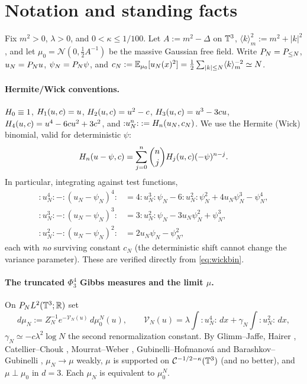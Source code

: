 \section*{Notation and standing facts}

Fix $m^2>0$, $\lambda>0$, and $0<\kappa\le 1/100$. Let $A:=m^2-\Delta$ on $\mathbb{T}^3$,
$\langle k\rangle_m^2:=m^2+|k|^2$, and let $\mu_0=\mathcal N(0,\tfrac12A^{-1})$ be the
massive Gaussian free field. Write $P_N=P_{\le N}$, $u_N=P_N u$,
$\psi_N=P_N\psi$, and
$c_N:=\mathbb{E}_{\mu_0}[u_N(x)^2]=\tfrac12\sum_{|k|\le N}\langle k\rangle_m^{-2}\simeq N$.

\paragraph{Hermite/Wick conventions.}
$H_0\equiv1$, $H_1(u,c)=u$, $H_2(u,c)=u^2-c$, $H_3(u,c)=u^3-3cu$,
$H_4(u,c)=u^4-6cu^2+3c^2$, and ${:}u_N^n{:}:=H_n(u_N,c_N)$. We use the
Hermite (Wick) binomial, valid for deterministic $\psi$:
\begin{equation}\label{eq:wickbin}
H_n(u-\psi,c)=\sum_{j=0}^n\binom njH_j(u,c)(-\psi)^{n-j}.
\end{equation}
In particular, integrating against test functions,
\begin{align}
{:}u_N^4{:}-{:}(u_N-\psi_N)^4{:}&=4{:}u_N^3{:}\psi_N-6{:}u_N^2{:}\psi_N^2+4u_N\psi_N^3-\psi_N^4,\label{eq:diff4}\\
{:}u_N^3{:}-{:}(u_N-\psi_N)^3{:}&=3{:}u_N^2{:}\psi_N-3u_N\psi_N^2+\psi_N^3,\label{eq:diff3}\\
{:}u_N^2{:}-{:}(u_N-\psi_N)^2{:}&=2u_N\psi_N-\psi_N^2,\label{eq:diff2}
\end{align}
each with \emph{no} surviving constant $c_N$ (the deterministic shift cannot change the
variance parameter). These are verified directly from \eqref{eq:wickbin}.

\paragraph{The truncated $\Phi^4_3$ Gibbs measures and the limit $\mu$.}
On $P_N L^2(\mathbb{T}^3;\mathbb{R})$ set
\begin{equation}\label{eq:muN}
d\mu_N:=Z_N^{-1}e^{-\mathcal V_N(u)}\,d\mu_0^N(u),\qquad
\mathcal V_N(u)=\lambda\!\int\!{:}u_N^4{:}\,dx+\gamma_N\!\int\!{:}u_N^2{:}\,dx,
\end{equation}
$\gamma_N\simeq-c\lambda^2\log N$ the second renormalization constant. By Glimm--Jaffe,
Hairer \cite{Hairer14}, Catellier--Chouk \cite{CC18}, Mourrat--Weber \cite{MW17},
Gubinelli--Hofmanov\'a \cite{GH21} and Barashkov--Gubinelli \cite{BG20}, $\mu_N\to\mu$
weakly, $\mu$ is supported on $\mathcal{C}^{-1/2-\kappa}(\mathbb{T}^3)$ (and no better), and
$\mu\perp\mu_0$ in $d=3$. Each $\mu_N$ is equivalent to $\mu_0^N$.

